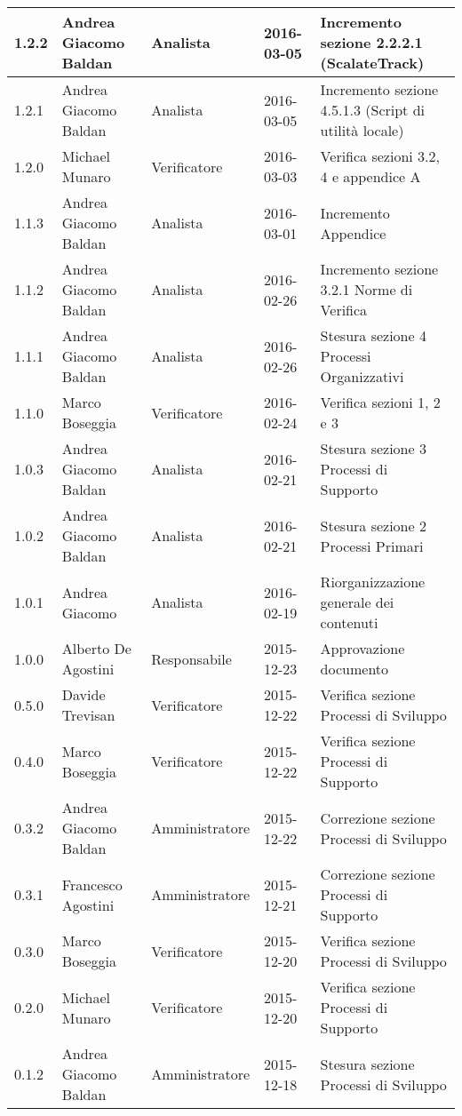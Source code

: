 \documentclass{scalatekids-article}
\begin{document}
\begin{center}
\begin{longtable}{| l | l | l | l | p{5cm} |}
    \hline
    1.2.2 & Andrea Giacomo Baldan & Analista & 2016-03-05 & Incremento sezione 2.2.2.1 (ScalateTrack)\\
    \hline
    1.2.1 & Andrea Giacomo Baldan & Analista & 2016-03-05 & Incremento sezione 4.5.1.3 (Script di utilità locale)\\
    \hline
    1.2.0 & Michael Munaro & Verificatore & 2016-03-03 & Verifica sezioni 3.2, 4 e appendice A \\
    \hline
    1.1.3 & Andrea Giacomo Baldan & Analista & 2016-03-01 & Incremento Appendice\\
    \hline
    1.1.2 & Andrea Giacomo Baldan & Analista & 2016-02-26 & Incremento sezione 3.2.1 Norme di Verifica\\
    \hline
    1.1.1 & Andrea Giacomo Baldan & Analista & 2016-02-26 & Stesura sezione 4 Processi Organizzativi\\
    \hline
    1.1.0 & Marco Boseggia & Verificatore & 2016-02-24 & Verifica sezioni 1, 2 e 3\\
    \hline
    1.0.3 & Andrea Giacomo Baldan & Analista & 2016-02-21 & Stesura sezione 3 Processi di Supporto\\
    \hline
    1.0.2 & Andrea Giacomo Baldan & Analista & 2016-02-21 & Stesura sezione 2 Processi Primari\\
    \hline
    1.0.1 & Andrea Giacomo & Analista & 2016-02-19 & Riorganizzazione generale dei contenuti\\
    \hline
    1.0.0 & Alberto De Agostini & Responsabile & 2015-12-23 & Approvazione documento\\
    \hline
    0.5.0 & Davide Trevisan & Verificatore & 2015-12-22 & Verifica sezione Processi di Sviluppo\\
    \hline
    0.4.0 & Marco Boseggia & Verificatore & 2015-12-22 & Verifica sezione Processi di Supporto\\
    \hline
    0.3.2 & Andrea Giacomo Baldan & Amministratore & 2015-12-22 & Correzione sezione Processi di Sviluppo\\
    \hline
    0.3.1 & Francesco Agostini & Amministratore & 2015-12-21 & Correzione sezione Processi di Supporto\\
    \hline
    0.3.0 & Marco Boseggia & Verificatore & 2015-12-20 & Verifica sezione Processi di Sviluppo\\
    \hline
    0.2.0 & Michael Munaro & Verificatore & 2015-12-20 & Verifica sezione Processi di Supporto\\
    \hline
    0.1.2 & Andrea Giacomo Baldan & Amministratore & 2015-12-18 & Stesura sezione Processi di Sviluppo\\

\end{longtable}
\end{center}
\end{document}
